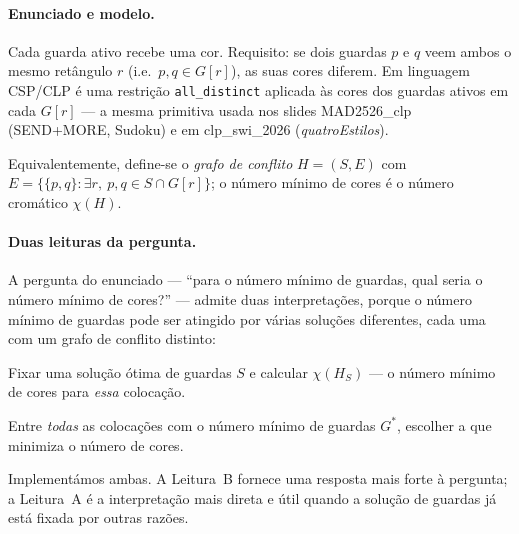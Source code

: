 \documentclass[11pt,a4paper]{article}
\begin{document}
\paragraph{Enunciado e modelo.}
Cada guarda ativo recebe uma cor. Requisito: se dois guardas $p$
e $q$ veem ambos o mesmo retângulo $r$ (i.e.~$p,q \in G[r]$),
as suas cores diferem. Em linguagem CSP/CLP é uma restrição
\texttt{all\_distinct} aplicada às cores dos guardas ativos em cada
$G[r]$ --- a mesma primitiva usada nos slides MAD2526\_clp (SEND+MORE,
Sudoku) e em clp\_swi\_2026 (\textit{quatroEstilos}).

Equivalentemente, define-se o \emph{grafo de conflito} $H = (S, E)$
com $E = \{\{p,q\}: \exists r,\ p,q \in S \cap G[r]\}$; o número
mínimo de cores é o número cromático $\chi(H)$.

\paragraph{Duas leituras da pergunta.}
A pergunta do enunciado --- ``para o número mínimo de guardas,
qual seria o número mínimo de cores?'' --- admite duas interpretações,
porque o número mínimo de guardas pode ser atingido por várias
soluções diferentes, cada uma com um grafo de conflito distinto:
\begin{description}[topsep=2pt,itemsep=0pt]
  \item[Leitura A (sequencial).] Fixar uma solução ótima de guardas
    $S$ e calcular $\chi(H_S)$ --- o número mínimo de cores para
    \emph{essa} colocação.
  \item[Leitura B (lexicográfica).] Entre \emph{todas} as colocações
    com o número mínimo de guardas $G^*$, escolher a que minimiza o
    número de cores.
\end{description}
Implementámos ambas. A Leitura~B fornece uma resposta mais forte à
pergunta; a Leitura~A é a interpretação mais direta e útil quando
a solução de guardas já está fixada por outras razões.
\end{document}
